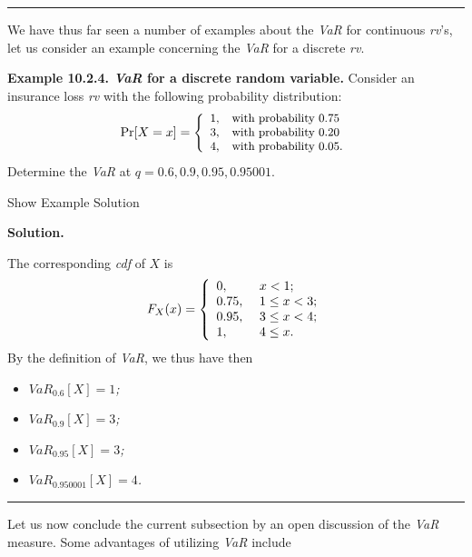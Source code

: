 \documentclass[]{book}
\providecommand{\tightlist}{%
  \setlength{\itemsep}{0pt}\setlength{\parskip}{0pt}}
\theoremstyle{definition}
\theoremstyle{definition}
\theoremstyle{definition}
\theoremstyle{remark}
\begin{document}
\begin{center}\rule{0.5\linewidth}{\linethickness}\end{center}

We have thus far seen a number of examples about the \emph{VaR} for
continuous \emph{rv}'s, let us consider an example concerning the
\emph{VaR} for a discrete \emph{rv}.

\textbf{Example 10.2.4. \emph{VaR} for a discrete random variable.}
Consider an insurance loss \emph{rv} with the following probability
distribution: \[
{\small
\Pr[X=x]=\left\{
                  \begin{array}{ll}
                    1, & \hbox{with probability $0.75$} \\
                    3, & \hbox{with probability $0.20$} \\
                    4, & \hbox{with probability $0.05$.}
                  \end{array}
                \right.
}
\] Determine the \emph{VaR} at \(q = 0.6, 0.9, 0.95, 0.95001\).

Show Example Solution

\hypertarget{toggleExamplePortMgt.2.4}{}
\textbf{Solution.}

The corresponding \emph{cdf} of \(X\) is \[
F_X(x)=\left\{
         \begin{array}{ll}
           0, & \hbox{ $x<1$;} \\
           0.75, & \hbox{ $1\leq x<3$;} \\
           0.95, & \hbox{ $3\leq x<4$;} \\
           1, & \hbox{ $4\leq x$.}
         \end{array}
       \right.
\] By the definition of \emph{VaR}, we thus have then

\begin{itemize}
\tightlist
\item
  \emph{\(VaR_{0.6}[X]=1\);}
\item
  \emph{\(VaR_{0.9}[X]=3\);}
\item
  \emph{\(VaR_{0.95}[X]=3\);}
\item
  \emph{\(VaR_{0.950001}[X]=4\).}
\end{itemize}

\begin{center}\rule{0.5\linewidth}{\linethickness}\end{center}

Let us now conclude the current subsection by an open discussion of the
\emph{VaR} measure. Some advantages of utilizing \emph{VaR} include
\end{document}
